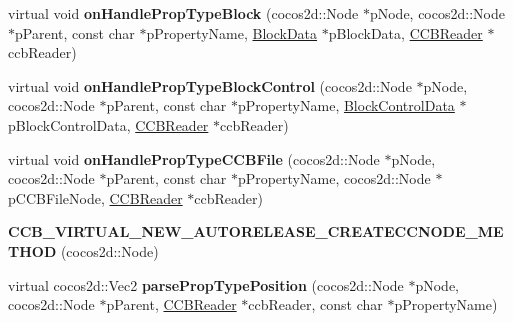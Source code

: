 \begin{DoxyCompactItemize}
\item 
\mbox{\label{classcocosbuilder_1_1NodeLoader_adaaa3aec58170ce624f88d867e034a13}} 
virtual void {\bfseries on\+Handle\+Prop\+Type\+Block} (cocos2d\+::\+Node $\ast$p\+Node, cocos2d\+::\+Node $\ast$p\+Parent, const char $\ast$p\+Property\+Name, \hyperlink{structcocosbuilder_1_1BlockData}{Block\+Data} $\ast$p\+Block\+Data, \hyperlink{classcocosbuilder_1_1CCBReader}{C\+C\+B\+Reader} $\ast$ccb\+Reader)
\item 
\mbox{\label{classcocosbuilder_1_1NodeLoader_a17bda4f069503e059a69ce80dd375ddc}} 
virtual void {\bfseries on\+Handle\+Prop\+Type\+Block\+Control} (cocos2d\+::\+Node $\ast$p\+Node, cocos2d\+::\+Node $\ast$p\+Parent, const char $\ast$p\+Property\+Name, \hyperlink{structcocosbuilder_1_1BlockControlData}{Block\+Control\+Data} $\ast$p\+Block\+Control\+Data, \hyperlink{classcocosbuilder_1_1CCBReader}{C\+C\+B\+Reader} $\ast$ccb\+Reader)
\item 
\mbox{\label{classcocosbuilder_1_1NodeLoader_abd5db741193b149188dc694fcff31c4e}} 
virtual void {\bfseries on\+Handle\+Prop\+Type\+C\+C\+B\+File} (cocos2d\+::\+Node $\ast$p\+Node, cocos2d\+::\+Node $\ast$p\+Parent, const char $\ast$p\+Property\+Name, cocos2d\+::\+Node $\ast$p\+C\+C\+B\+File\+Node, \hyperlink{classcocosbuilder_1_1CCBReader}{C\+C\+B\+Reader} $\ast$ccb\+Reader)
\item 
\mbox{\label{classcocosbuilder_1_1NodeLoader_a44b0f2a9f4f9074d024e2305b4c1b8e8}} 
{\bfseries C\+C\+B\+\_\+\+V\+I\+R\+T\+U\+A\+L\+\_\+\+N\+E\+W\+\_\+\+A\+U\+T\+O\+R\+E\+L\+E\+A\+S\+E\+\_\+\+C\+R\+E\+A\+T\+E\+C\+C\+N\+O\+D\+E\+\_\+\+M\+E\+T\+H\+OD} (cocos2d\+::\+Node)
\item 
\mbox{\label{classcocosbuilder_1_1NodeLoader_a2e7159a262366553517ed89d0b6394a5}} 
virtual cocos2d\+::\+Vec2 {\bfseries parse\+Prop\+Type\+Position} (cocos2d\+::\+Node $\ast$p\+Node, cocos2d\+::\+Node $\ast$p\+Parent, \hyperlink{classcocosbuilder_1_1CCBReader}{C\+C\+B\+Reader} $\ast$ccb\+Reader, const char $\ast$p\+Property\+Name)
\item 
\mbox{\label{classcocosbuilder_1_1NodeLoader_a8b341b173b1461f1797eaffb6bef3554}} 

\end{DoxyCompactItemize}
